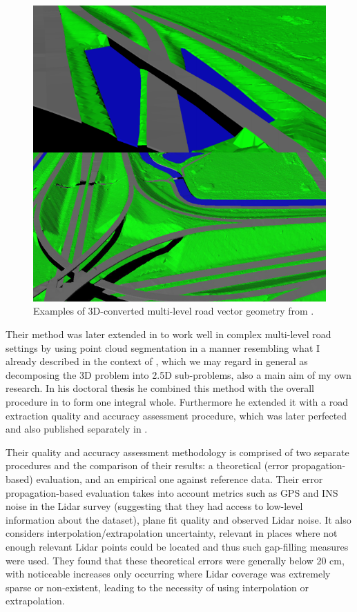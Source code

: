 \begin{figure}
    \includegraphics[width=\linewidth]{final_report/figs/oudeElberink_vosselman_2006_03.png} 
    \caption{Examples of 3D-converted multi-level road vector geometry from \cite{oudeElberink_vosselman_2006}.}
    \label{fig:conversionartefacts}
\end{figure}

Their method was later extended in \cite{oudeElberink_vosselman_2009} to work well in complex multi-level road settings by using point cloud segmentation in a manner resembling what I already described in the context of \cite{boyko_funkhauser_2011}, which we may regard in general as decomposing the 3D problem into 2.5D sub-problems, also a main aim of my own research. In his doctoral thesis \cite{oudeElberink_2010} he combined this method with the overall procedure in \cite{oudeElberink_vosselman_2006} to form one integral whole. Furthermore he extended it with a road extraction quality and accuracy assessment procedure, which was later perfected and also published separately in \cite{oudeElberink_vosselman_2012}.

Their quality and accuracy assessment methodology is comprised of two separate procedures and the comparison of their results: a theoretical (error propagation-based) evaluation, and an empirical one against reference data. Their error propagation-based evaluation takes into account metrics such as GPS and INS noise in the Lidar survey (suggesting that they had access to low-level information about the dataset), plane fit quality and observed Lidar noise. It also considers interpolation/extrapolation uncertainty, relevant in places where not enough relevant Lidar points could be located and thus such gap-filling measures were used. They found that these theoretical errors were generally below 20 cm, with noticeable increases only occurring where Lidar coverage was extremely sparse or non-existent, leading to the necessity of using interpolation or extrapolation. 

